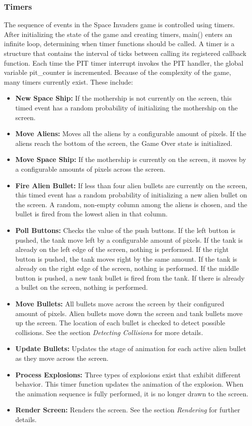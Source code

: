 \documentclass[11pt,letter,oneside]{report}
\begin{document}
\subsubsection{Timers}
\label{sec:timers}
The sequence of events in the Space Invaders game is controlled using timers. After initializing the state of the game and creating timers, main() enters an infinite loop, determining when timer functions should be called. A timer is a structure that contains the interval of ticks between calling its registered callback function. Each time the PIT timer interrupt invokes the PIT handler, the global variable pit\_counter is incremented. Because of the complexity of the game, many timers currently exist. These include:

\begin{itemize}
\item \textbf{New Space Ship:} If the mothership is not currently on the screen, this timed event has a random probability of initializing the mothership on the screen.
\item  \textbf{Move Aliens:}  Moves all the aliens by a configurable amount of pixels.  If the aliens reach the bottom of the screen, the Game Over state is initialized.
\item  \textbf{Move Space Ship:}  If the mothership is currently on the screen, it moves by a configurable amounts of pixels across the screen.
\item  \textbf{Fire Alien Bullet:}  If less than four alien bullets are currently on the screen, this timed event has a random probability of initializing a new alien bullet on the screen.  A random, non-empty column among the aliens is chosen, and the bullet is fired from the lowest alien in that column.
\item  \textbf{Poll Buttons:}  Checks the value of the push buttons.  If the left button is pushed, the tank move  left by a configurable amount of pixels.  If the tank is already on the left edge of the screen, nothing is performed.  If the right button is pushed, the tank moves right by the same amount.  If the tank is already on the right edge of the screen, nothing is performed.  If the middle button is pushed, a new tank bullet is fired from the tank.  If there is already a bullet on the screen, nothing is performed.
\item  \textbf{Move Bullets:}  All bullets move across the screen by their configured amount of pixels.  Alien bullets move down the screen and tank bullets move up the screen.  The location of each bullet is checked to detect possible collisions.  See the section \textit{Detecting Collisions} for more details.
\item  \textbf{Update Bullets:}  Updates the stage of animation for each active alien bullet as they move across the screen.
\item  \textbf{Process Explosions:}  Three types of explosions exist that exhibit different behavior.  This timer function updates the animation of the explosion. When the animation sequence is fully performed, it is no longer drawn to the screen.
\item  \textbf{Render Screen:}  Renders the screen.  See the section \textit{Rendering} for further details.
\end{itemize}
\end{document}
